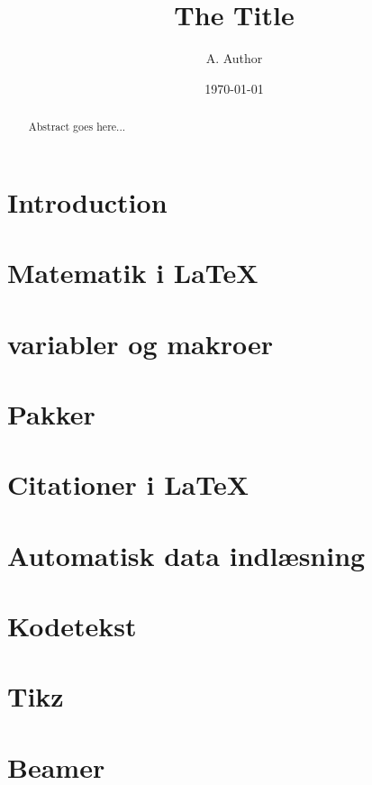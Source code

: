 \documentclass{article}
\title{The Title}
\author{A. Author}
\date{\today}
\begin{document}
\maketitle

\begin{abstract}
	Abstract goes here...
\end{abstract}

\section{Introduction}

\section{Matematik i \LaTeX}


\section{variabler og makroer}

\section{Pakker}


\section{Citationer i \LaTeX}


\section{Automatisk data indlæsning}

\section{Kodetekst}


\section{Tikz}


\section{Beamer}
\end{document}
